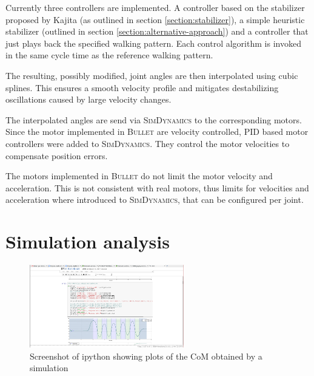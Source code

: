 \documentclass[english,ngerman]{KITreprt}
\newcommand{\name}[1]{\textsc{#1}}
\begin{document}
Currently three controllers are implemented. A controller based on the
stabilizer proposed by Kajita (as outlined in section
\ref{section:stabilizer}), a simple heuristic stabilizer (outlined in
section \ref{section:alternative-approach}) and a controller that just
plays back the specified walking pattern. Each control algorithm is
invoked in the same cycle time as the reference walking pattern.

The resulting, possibly modified, joint angles are then interpolated
using cubic splines. This ensures a smooth velocity profile and
mitigates destabilizing oscillations caused by large velocity changes.

The interpolated angles are send via \name{SimDynamics} to the
corresponding motors. Since the motor implemented in \name{Bullet} are
velocity controlled, PID based motor controllers were added to
\name{SimDynamics}. They control the motor velocities to compensate
position errors.

The motors implemented in \name{Bullet} do not limit the motor velocity
and acceleration. This is not consistent with real motors, thus limits
for velocities and acceleration where introduced to \name{SimDynamics},
that can be configured per joint.

\section{Simulation analysis}\label{simulation-analysis}

\begin{figure}
  \begin{center}
     \includegraphics[width=0.6\textwidth]{images/plotting_screenshot.png}
  \end{center}
  \caption{Screenshot of ipython showing plots of the CoM obtained by a simulation}
\end{figure}
\end{document}
